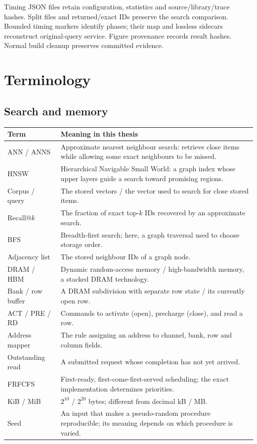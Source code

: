 \documentclass[11pt,a4paper]{report}
\begin{document}
Timing JSON files retain configuration, statistics and source/library/trace hashes. Split files and returned/exact IDs preserve the search comparison. Bounded timing markers identify phases; their map and lossless sidecars reconstruct original-query service. Figure provenance records result hashes. Normal build cleanup preserves committed evidence.

\chapter{Terminology}
\label{ch:terms}
\section{Search and memory}
\begin{longtable}{p{}p{}}\toprule
Term & Meaning in this thesis\\\midrule\endhead
ANN / ANNS & Approximate nearest neighbour search: retrieve close items while allowing some exact neighbours to be missed.\\
HNSW & Hierarchical Navigable Small World: a graph index whose upper layers guide a search toward promising regions.\\
Corpus / query & The stored vectors / the vector used to search for close stored items.\\
Recall@$k$ & The fraction of exact top-$k$ IDs recovered by an approximate search.\\
BFS & Breadth-first search; here, a graph traversal used to choose storage order.\\
Adjacency list & The stored neighbour IDs of a graph node.\\
DRAM / HBM & Dynamic random-access memory / high-bandwidth memory, a stacked DRAM technology.\\
Bank / row buffer & A DRAM subdivision with separate row state / its currently open row.\\
ACT / PRE / RD & Commands to activate (open), precharge (close), and read a row.\\
Address mapper & The rule assigning an address to channel, bank, row and column fields.\\
Outstanding read & A submitted request whose completion has not yet arrived.\\
FRFCFS & First-ready, first-come-first-served scheduling; the exact implementation determines priorities.\\
KiB / MiB & $2^{10}$ / $2^{20}$ bytes; different from decimal kB / MB.\\
Seed & An input that makes a pseudo-random procedure reproducible; its meaning depends on which procedure is varied.\\
\bottomrule
\end{longtable}
\clearpage
\end{document}
